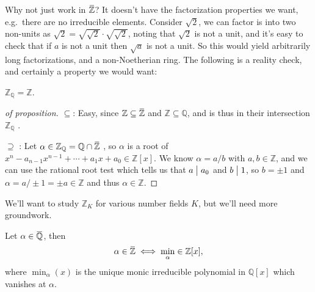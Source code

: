 \begin{remark}

Why not just work in
\(\mkern 1.5mu\overline{\mkern-1.5mu{\mathbb{Z}}\mkern-1.5mu}\mkern 1.5mu\)?
It doesn't have the factorization properties we want, e.g.~there are no
irreducible elements. Consider \(\sqrt 2\), we can factor is into two
non-units as \(\sqrt{2} = \sqrt{\sqrt 2} \cdot \sqrt{\sqrt 2}\), noting
that \(\sqrt 2\) is not a unit, and it's easy to check that if \(a\) is
not a unit then \(\sqrt a\) is not a unit. So this would yield
arbitrarily long factorizations, and a non-Noetherian ring. The
following is a reality check, and certainly a property we would want:

\end{remark}

\begin{proposition}

\({\mathbb{Z}}_{\mathbb{Q}}= {\mathbb{Z}}\).

\end{proposition}

\begin{proof}[of proposition]

\(\subseteq\): Easy, since
\({\mathbb{Z}}\subseteq \mkern 1.5mu\overline{\mkern-1.5mu{\mathbb{Z}}\mkern-1.5mu}\mkern 1.5mu\)
and \({\mathbb{Z}}\subseteq {\mathbb{Q}}\), and is thus in their
intersection \({\mathbb{Z}}_{\mathbb{Q}}\) .

\hfill\break

\(\supseteq\) : Let
\(\alpha\in {\mathbb{Z}}_{\mathbb{Q}}= {\mathbb{Q}}\cap\mkern 1.5mu\overline{\mkern-1.5mu{\mathbb{Z}}\mkern-1.5mu}\mkern 1.5mu\)
, so \(\alpha\) is a root of
\(x^n - a_{n-1}x^{n-1} + \cdots + a_1x + a_0 \in {\mathbb{Z}}[x]\). We
know \(\alpha= a/b\) with \(a,b \in {\mathbb{Z}}\), and we can use the
rational root test which tells us that \(a\bigm|a_0\) and \(b\bigm|1\),
so \(b = \pm 1\) and \(\alpha = a/\pm 1 = \pm a \in {\mathbb{Z}}\) and
thus \(\alpha \in {\mathbb{Z}}\).

\end{proof}

\begin{remark}

We'll want to study \({\mathbb{Z}}_K\) for various number fields \(K\),
but we'll need more groundwork.

\end{remark}

\begin{proposition}

Let
\(\alpha \in \mkern 1.5mu\overline{\mkern-1.5mu{\mathbb{Q}}\mkern-1.5mu}\mkern 1.5mu\),
then
\begin{align*} \alpha\in \mkern 1.5mu\overline{\mkern-1.5mu{\mathbb{Z}}\mkern-1.5mu}\mkern 1.5mu\iff \min_ \alpha \in {\mathbb{Z}}[x], \end{align*}
where \(\min_ \alpha(x)\) is the unique monic irreducible polynomial in
\({\mathbb{Q}}[x]\) which vanishes at \(\alpha\).

\end{proposition}

